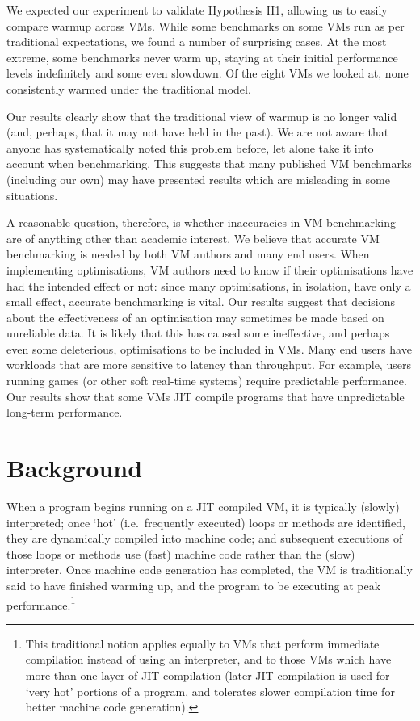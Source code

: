 \documentclass[preprint,numbers,10pt]{sigplanconf}
\begin{document}
We expected our experiment to validate Hypothesis H1, allowing us to
easily compare warmup across VMs. While some benchmarks on some VMs run as per
traditional expectations, we found a number of surprising cases. At
the most extreme, some benchmarks never warm up, staying at their initial performance
levels indefinitely and some even slowdown. Of the eight
VMs we looked at, none consistently warmed under the traditional model.

Our results clearly show that the traditional view of warmup is no longer valid (and, perhaps,
that it may not have held in the past). We are not aware that anyone has systematically noted this
problem before, let alone take it into account when benchmarking. This suggests
that many published VM benchmarks (including our own) may have presented
results which are misleading in some situations.

A reasonable question, therefore, is whether inaccuracies in VM benchmarking are of anything
other than academic interest. We believe that accurate VM benchmarking is needed
by both VM authors and many end users. When
implementing optimisations, VM authors need to know if their optimisations have
had the intended effect or not: since many optimisations, in isolation, have only a
small effect, accurate benchmarking is vital. Our results suggest that decisions
about the effectiveness of an optimisation may sometimes be made based on
unreliable data.
It is likely that this has caused some ineffective, and perhaps even some deleterious,
optimisations to be included in VMs. Many end users have workloads that are more
sensitive to latency than throughput. For example, users running games (or other
soft real-time systems) require predictable performance. Our results show that some
VMs JIT compile programs that have unpredictable long-term performance.

%


\section{Background}
\label{sec:warmup}

When a program begins running on a JIT compiled VM, it is typically (slowly)
interpreted; once `hot' (i.e.~frequently executed) loops or methods are
identified, they are dynamically compiled into machine code; and subsequent
executions of those loops or methods use (fast) machine code rather than the
(slow) interpreter. Once machine code generation has completed, the VM is
traditionally said to have finished warming up, and the program to be executing
at peak performance.\footnote{This traditional notion applies equally to VMs
that perform immediate compilation instead of using an interpreter, and to
those VMs which have more than one layer of JIT compilation (later JIT
compilation is used for `very hot' portions of a program, and tolerates slower
compilation time for better machine code generation).}
\end{document}
